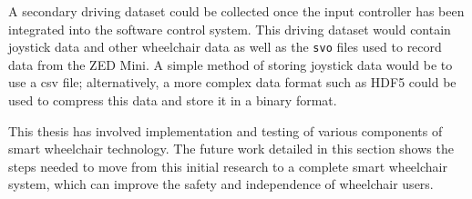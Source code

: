 A secondary driving dataset could be collected once the input controller has been integrated into
the software control system. This driving dataset would contain joystick data and other wheelchair data
as well as the \texttt{svo} files used to record data from the ZED Mini. A simple method of storing joystick
data would be to use a csv file; alternatively, a more complex data format such as HDF5 could be used
to compress this data and store it in a binary format.

This thesis has involved implementation and testing
of various components of smart wheelchair technology. The future work detailed in
this section shows the steps needed to move from this initial research to a complete
smart wheelchair system, which can improve the safety and independence of wheelchair users.







